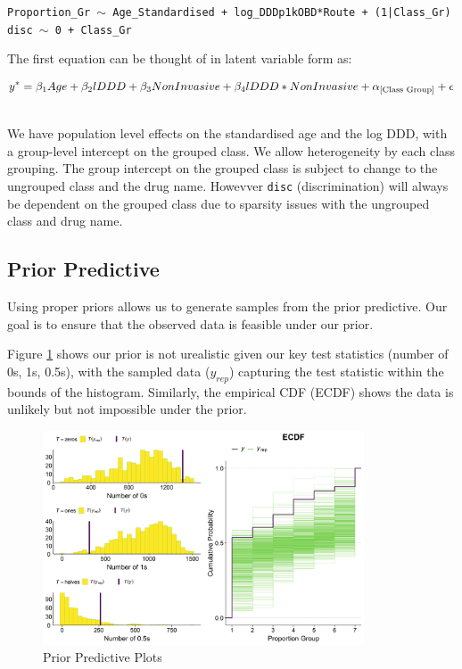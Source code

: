 \documentclass[11pt,twoside]{article}
\numberwithin{Theorem}{section}
\numberwithin{Definition}{section}
\numberwithin{Lemma}{section}
\numberwithin{Algorithm}{section}
\numberwithin{equation}{section}
\begin{document}
\vspace{3mm}

\texttt{Proportion\_Gr $\sim$ Age\_Standardised + log\_DDDp1kOBD*Route + (1|Class\_Gr)} \\
\texttt{disc $\sim$ 0 + Class\_Gr}

\vspace{2mm}

The first equation can be thought of in latent variable form as:

\vspace{1mm}

\begin{align}
y^* = \beta_1Age + \beta_2 lDDD+ \beta_3 NonInvasive  + \beta_4 lDDD*NonInvasive + \alpha_{[\text{Class Group}]}+ \epsilon \\
\notag
\end{align}

We have population level effects on the standardised age and the log DDD, with a group-level intercept on the grouped class. We allow heterogeneity by each class grouping. The group intercept on the grouped class is subject to change to the ungrouped class and the drug name. Howevver \texttt{disc} (discrimination) will always be dependent on the grouped class due to sparsity issues with the ungrouped class and drug name. 

\subsection{Prior Predictive}

Using proper priors allows us to generate samples from the prior predictive. Our goal is to ensure that the observed data is feasible under our prior.

Figure \ref{fig::3_PriorPred} shows our prior is not urealistic given our key test statistics (number of 0s, 1s, 0.5s), with the sampled data ($y_{rep}$) capturing the test statistic within the bounds of the histogram. Similarly, the empirical CDF (ECDF) shows the data is unlikely but not impossible under the prior.

\begin{figure}[h!]
	\centering
	\includegraphics[width=0.85\textwidth]{Figures/3_1_Primary_PriPred.png}
	\caption{Prior Predictive Plots} \label{fig::3_PriorPred}	
\end{figure}
\end{document}
